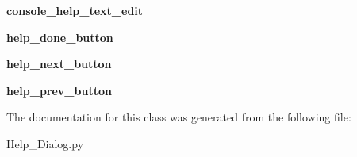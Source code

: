\begin{DoxyCompactItemize}
\item 
\hypertarget{classHelp__Dialog_1_1Ui__Dialog_a61f485a9a6428e4ff27f4ddf2a782575}{{\bfseries console\-\_\-help\-\_\-text\-\_\-edit}}\label{classHelp__Dialog_1_1Ui__Dialog_a61f485a9a6428e4ff27f4ddf2a782575}

\item 
\hypertarget{classHelp__Dialog_1_1Ui__Dialog_ad1c79d0b8660d10bcd5525f7033e9b4e}{{\bfseries help\-\_\-done\-\_\-button}}\label{classHelp__Dialog_1_1Ui__Dialog_ad1c79d0b8660d10bcd5525f7033e9b4e}

\item 
\hypertarget{classHelp__Dialog_1_1Ui__Dialog_ad6b493cc7614d98c197ece6fe674f52b}{{\bfseries help\-\_\-next\-\_\-button}}\label{classHelp__Dialog_1_1Ui__Dialog_ad6b493cc7614d98c197ece6fe674f52b}

\item 
\hypertarget{classHelp__Dialog_1_1Ui__Dialog_a93638041308b0613939e1d2e3b4b13b8}{{\bfseries help\-\_\-prev\-\_\-button}}\label{classHelp__Dialog_1_1Ui__Dialog_a93638041308b0613939e1d2e3b4b13b8}

\end{DoxyCompactItemize}


The documentation for this class was generated from the following file\-:\begin{DoxyCompactItemize}
\item 
Help\-\_\-\-Dialog.\-py\end{DoxyCompactItemize}
